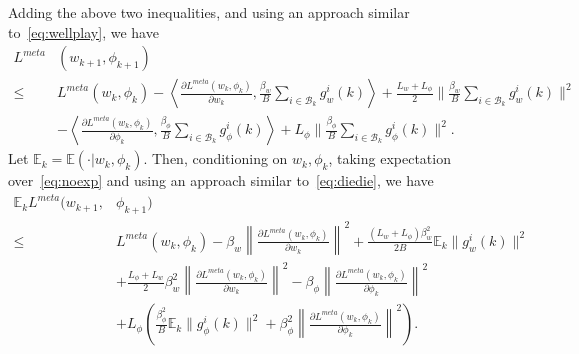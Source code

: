 \documentclass{osudissert96}
\begin{document}
\hspace{-0.15cm}Adding the above two inequalities, and using an approach similar to~\cref{eq:wellplay}, we have 
\begin{align}\label{eq:noexp}
L^{meta}&(w_{k+1},\phi_{k+1}) \nonumber
\\\leq&  L^{meta}(w_k,\phi_k) - \left\langle \frac{\partial L^{meta}(w_k,\phi_k)}{\partial w_k}, \frac{\beta_w}{B}\sum_{i\in\mathcal{B}_k} g_{w}^i (k) \right\rangle + \frac{L_w+L_\phi }{2} \Big\| \frac{\beta_w}{B}\sum_{i\in\mathcal{B}_k} g_{w}^i (k)\Big\|^2 \nonumber
\\ &-\left\langle \frac{\partial L^{meta}(w_{k},\phi_k)}{\partial \phi_k},\frac{\beta_\phi}{B}\sum_{i\in\mathcal{B}_k}g_{\phi}^i(k)  \right\rangle + L_\phi \Big\|\frac{\beta_\phi}{B}\sum_{i\in\mathcal{B}_k}g_{\phi}^i(k)\Big\|^2.
\end{align}
Let $\mathbb{E}_k=\mathbb{E}(\cdot | w_k,\phi_k)$. Then, conditioning on $w_k,\phi_k$, taking expectation over~\cref{eq:noexp} and using an approach similar to~\cref{eq:diedie}, we have 
\begin{align}\label{eq:finals}
\mathbb{E}_k L^{meta}(w_{k+1},&\phi_{k+1}) \nonumber
\\\leq&  L^{meta}(w_k,\phi_k) - \beta_w\left\| \frac{\partial L^{meta}(w_k,\phi_k)}{\partial w_k}\right\|^2 + \frac{(L_w+L_\phi)\beta_w^2}{2B}\mathbb{E}_k\big\|g_{w}^i(k) \big\|^2 \nonumber
\\ &+ \frac{L_\phi+L_w}{2}\beta_w^2 \left\| \frac{\partial L^{meta}(w_k,\phi_k)}{\partial w_k}\right\|^2-\beta_\phi\left\| \frac{\partial L^{meta}(w_{k},\phi_k)}{\partial \phi_k}  \right\|^2 \nonumber
\\&+L_\phi\left(\frac{\beta_\phi^2}{B}\mathbb{E}_k\big\|g_{\phi}^i(k) \big\|^2 + \beta_\phi^2 \left\| \frac{\partial L^{meta}(w_k,\phi_k)}{\partial \phi_k}\right\|^2\right).
\end{align}
 
\end{document}
